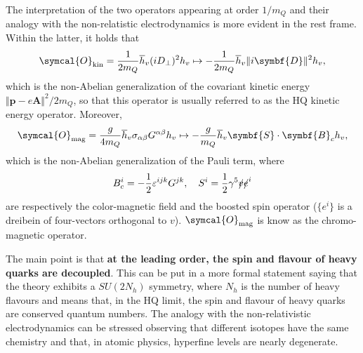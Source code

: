 The interpretation of the two operators appearing at order $1/m_Q$ and their analogy with the non-relatistic electrodynamics is more evident in the rest frame. Within the latter, it holds that
\begin{equation}
  \symcal{O}_\text{kin} = \frac{1}{2 m_Q} \adj{h}_v (i D_\perp)^2 h_v \mapsto - \frac{1}{2 m_Q} \adj{h}_v \Vert i \symbf{D} \Vert^2 h_v ,
\end{equation}
which is the non-Abelian generalization of the covariant kinetic energy $\Vert \symbf{p} - e \symbf{A} \Vert^2 / 2 m_Q$, so that this operator is usually referred to as the HQ kinetic energy operator. Moreover, 
\begin{equation}
  \symcal{O}_\text{mag} = \frac{g}{4 m_Q} \adj{h}_v \sigma_{\alpha \beta} G^{\alpha \beta} h_v \mapsto - \frac{g}{m_Q} \adj{h}_v \symbf{S} \cdot \symbf{B}_c h_v ,
  \label{eq:heavy_chromomagnetic_operator}
\end{equation}
which is the non-Abelian generalization of the Pauli term, where
\begin{equation}
  B^i_c = - \frac{1}{2} \varepsilon^{i j k} G^{j k} , \quad S^i = \frac{1}{2} \gamma^5 \slashed{v} \slashed{e}^i 
\end{equation}
are respectively the color-magnetic field and the boosted spin operator ($\{ e^i \}$ is a dreibein of four-vectors orthogonal to $v$). $\symcal{O}_\text{mag}$ is know as the chromo-magnetic operator.

The main point is that \textbf{at the leading order, the spin and flavour of heavy quarks are decoupled}. This can be put in a more formal statement saying that the theory exhibits a $SU(2 N_h)$ symmetry, where $N_h$ is the number of heavy flavours and means that, in the HQ limit, the spin and flavour of heavy quarks are conserved quantum numbers. The analogy with the non-relativistic electrodynamics can be stressed observing that different isotopes have the same chemistry and that, in atomic physics, hyperfine levels are nearly degenerate. 


